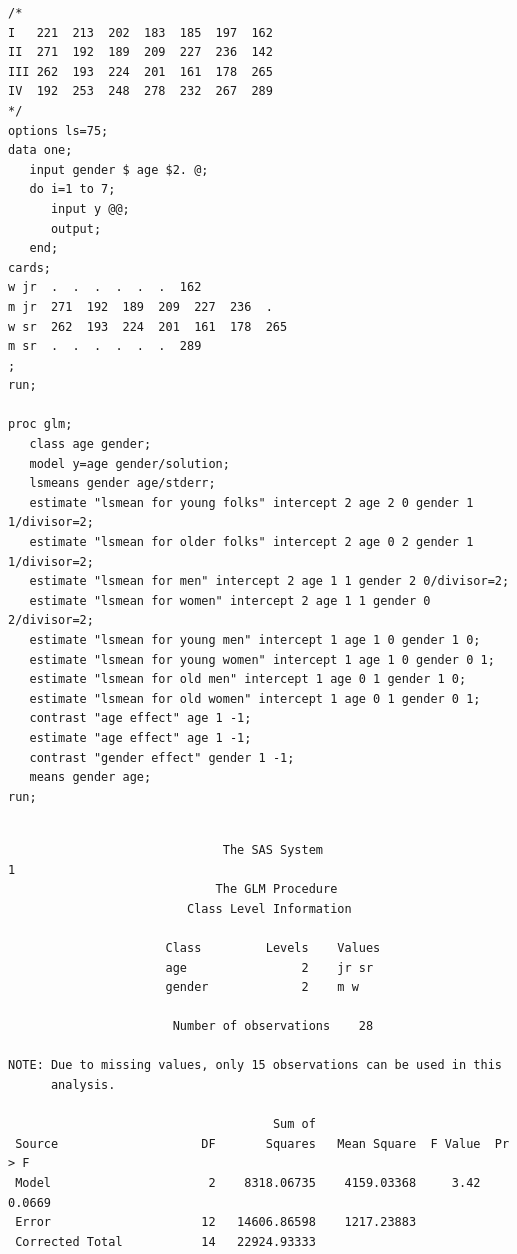 \begin{large}
\begin{verbatim}
/*
I   221  213  202  183  185  197  162
II  271  192  189  209  227  236  142
III 262  193  224  201  161  178  265
IV  192  253  248  278  232  267  289
*/
options ls=75;
data one;
   input gender $ age $2. @;
   do i=1 to 7;
      input y @@;
      output;
   end;
cards;
w jr  .  .  .  .  .  .  162 
m jr  271  192  189  209  227  236  .
w sr  262  193  224  201  161  178  265
m sr  .  .  .  .  .  .  289
;
run;

proc glm;
   class age gender; 
   model y=age gender/solution; 
   lsmeans gender age/stderr; 
   estimate "lsmean for young folks" intercept 2 age 2 0 gender 1 1/divisor=2; 
   estimate "lsmean for older folks" intercept 2 age 0 2 gender 1 1/divisor=2; 
   estimate "lsmean for men" intercept 2 age 1 1 gender 2 0/divisor=2; 
   estimate "lsmean for women" intercept 2 age 1 1 gender 0 2/divisor=2; 
   estimate "lsmean for young men" intercept 1 age 1 0 gender 1 0;
   estimate "lsmean for young women" intercept 1 age 1 0 gender 0 1;
   estimate "lsmean for old men" intercept 1 age 0 1 gender 1 0;
   estimate "lsmean for old women" intercept 1 age 0 1 gender 0 1;
   contrast "age effect" age 1 -1;
   estimate "age effect" age 1 -1;
   contrast "gender effect" gender 1 -1;
   means gender age; 
run;

\end{verbatim}
\newpage
\begin{verbatim}

                              The SAS System                              1
                             The GLM Procedure
                         Class Level Information
 
                      Class         Levels    Values
                      age                2    jr sr 
                      gender             2    m w   

                       Number of observations    28

NOTE: Due to missing values, only 15 observations can be used in this 
      analysis.

                                     Sum of
 Source                    DF       Squares   Mean Square  F Value  Pr > F
 Model                      2    8318.06735    4159.03368     3.42  0.0669
 Error                     12   14606.86598    1217.23883                 
 Corrected Total           14   22924.93333                               


\end{verbatim}
\end{large}
